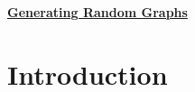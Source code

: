 \documentclass[10pt,a4paper]{article}
\begin{document}
	     \begin{center}
	 	\Large{\underline{\bf Generating Random Graphs}}
	 \end{center}
 
 \section{Introduction}
 
\end{document}
